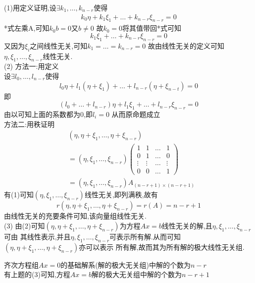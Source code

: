 \documentclass[12pt, a4paper, oneside, UTF8]{ctexbook}
\begin{document}
\begin{enumerate}
    \begin{solution}
    (1)用定义证明,设$\exists k_1,\ldots,k_{n-r}$使得 
    \begin{align*}
        k_0\eta+k_1\xi_1+\ldots+k_{n-r}\xi_{n-r}=0 \tag{*}
    \end{align*}
    *式左乘A,可知$k_0 b = 0$又$b\neq 0$ 故$k_0=0$将其值带回*式可知
    $$
    k_1\xi_1+\ldots+k_{n-r}\xi_{n-r} = 0
    $$
    又因为$\xi_i$之间线性无关,可知$k_1=\ldots=k_{n-r}=0$ 故由线性无关的定义可知$\eta,\xi_1,\ldots,\xi_{n-r}$线性无关.  \\
    (2) 方法一:用定义 \\
    设$\exists l_0,\ldots,l_{n-r}$使得 
    $$
    l_0\eta + l_1(\eta+\xi_1) + \ldots + l_{n-r}(\eta+\xi_{n-t}) = 0
    $$
    即
    $$
    (l_0+\ldots+l_{n-r})\eta + l_1\xi_1 + \ldots + l_{n-r}\xi_{n-r} = 0
    $$
    由以可知上面的系数都为0,即$l_i = 0$ 从而原命题成立 \\
    方法二:用秩证明
    \begin{align*}
        &(\eta, \eta+\xi_1,\ldots,\eta+\xi_{n-r}) \\
        &=(\eta,\xi_1,\ldots,\xi_{n-r})\begin{pmatrix}
            1 & 1 & \ldots & 1 \\
            0 & 1 & \ldots & 0 \\
            \vdots & \vdots & \ldots & \vdots \\
            0 & 0 & \ldots & 1 
        \end{pmatrix} \\
        & = (\eta,\xi_1,\ldots,\xi_{n-r}) A_{(n-r+1)\times(n-r+1)}
    \end{align*}
    有(1)可知$(\eta,\xi_1,\ldots,\xi_{n-r})$线性无关,即列满秩,故有
    $$
    r(\eta, \eta+\xi_1,\ldots,\eta+\xi_{n-r}) = r(A) = n - r + 1
    $$
    由线性无关的充要条件可知,该向量组线性无关.  \\
    (3) 由(2)可知$(\eta, \eta+\xi_1,\ldots,\eta+\xi_{n-r})$为方程$Ax=b$线性无关的解,且$\eta,\xi_1,\ldots,\xi_{n-r}$可由
    其线性表示,并且$\eta,\xi_1,\ldots,\xi_{n-r}$可表示所有解.从而可知$(\eta, \eta+\xi_1,\ldots,\eta+\xi_{n-r})$亦可以表示
    所有解,故而其为所有解的极大线性无关组. 
    \end{solution}
    \begin{definition}[(非)齐次方程解的个数]
        齐次方程组$Ax=0$的基础解系(解的极大无关组)中解的个数为$n-r$ \\
        有上题的(3)可知,方程$Ax=b$解的极大无关组中解的个数为$n-r+1$  
    \end{definition}
\end{enumerate}
\end{document}
